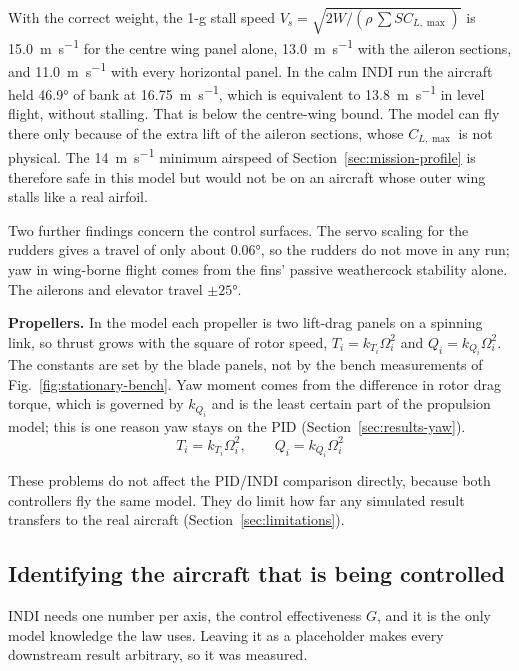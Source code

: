 \documentclass{article}
\begin{document}
With the correct weight, the 1-g stall speed $V_s=\sqrt{2W/(\rho\,\sum S C_{L,\max})}$ is \SI{15.0}{\meter\per\second} for the centre wing panel alone, \SI{13.0}{\meter\per\second} with the aileron sections, and \SI{11.0}{\meter\per\second} with every horizontal panel. In the calm INDI run the aircraft held \ang{46.9} of bank at \SI{16.75}{\meter\per\second}, which is equivalent to \SI{13.8}{\meter\per\second} in level flight, without stalling. That is below the centre-wing bound. The model can fly there only because of the extra lift of the aileron sections, whose $C_{L,\max}$ is not physical. The \SI{14}{\meter\per\second} minimum airspeed of Section~\ref{sec:mission-profile} is therefore safe in this model but would not be on an aircraft whose outer wing stalls like a real airfoil.

Two further findings concern the control surfaces. The servo scaling for the rudders gives a travel of only about \ang{0.06}, so the rudders do not move in any run; yaw in wing-borne flight comes from the fins' passive weathercock stability alone. The ailerons and elevator travel $\pm\ang{25}$.

\textbf{Propellers.} In the model each propeller is two lift-drag panels on a spinning link, so thrust grows with the square of rotor speed, $T_i=k_{T_i}\Omega_i^2$ and $Q_i=k_{Q_i}\Omega_i^2$. The constants are set by the blade panels, not by the bench measurements of Fig.~\ref{fig:stationary-bench}. Yaw moment comes from the difference in rotor drag torque, which is governed by $k_{Q_i}$ and is the least certain part of the propulsion model; this is one reason yaw stays on the PID (Section~\ref{sec:results-yaw}).
\begin{equation}
    T_i=k_{T_i}\Omega_i^2,\qquad Q_i=k_{Q_i}\Omega_i^2
    \label{eq:propeller}
\end{equation}

These problems do not affect the PID/INDI comparison directly, because both controllers fly the same model. They do limit how far any simulated result transfers to the real aircraft (Section~\ref{sec:limitations}).

\subsection{Identifying the aircraft that is being controlled}
\label{sec:results-identification}
INDI needs one number per axis, the control effectiveness $G$, and it is the only model knowledge the law uses. Leaving it as a placeholder makes every downstream result arbitrary, so it was measured.
\end{document}
